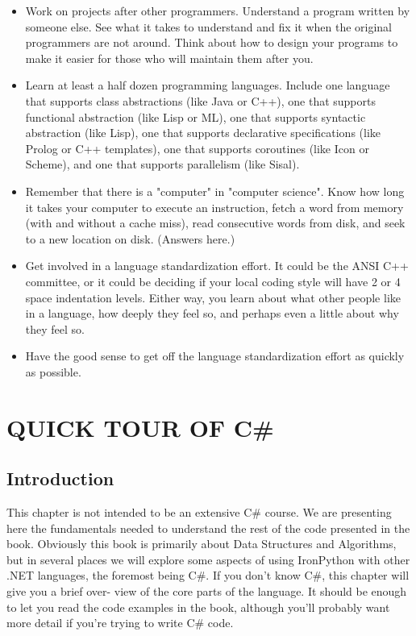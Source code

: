 \documentclass[12pt,a4paper,final,twoside,titlepage]{book}
\begin{document}
\begin{itemize}
\item Work on projects after other programmers. Understand a program written by someone else. See what it takes to understand and fix it when the original programmers are not around. Think about how to design your programs to make it easier for those who will maintain them after you.
\item Learn at least a half dozen programming languages. Include one language that supports class abstractions (like Java or C++), one that supports functional abstraction (like Lisp or ML), one that supports syntactic abstraction (like Lisp), one that supports declarative specifications (like Prolog or C++ templates), one that supports coroutines (like Icon or Scheme), and one that supports parallelism (like Sisal).
\item Remember that there is a "computer" in "computer science". Know how long it takes your computer to execute an instruction, fetch a word from memory (with and without a cache miss), read consecutive words from disk, and seek to a new location on disk. (Answers here.)
\item Get involved in a language standardization effort. It could be the ANSI C++ committee, or it could be deciding if your local coding style will have 2 or 4 space indentation levels. Either way, you learn about what other people like in a language, how deeply they feel so, and perhaps even a little about why they feel so.
\item Have the good sense to get off the language standardization effort as quickly as possible.
\end{itemize}

\chapter{QUICK TOUR OF C\#}
\section{Introduction}
This chapter is not intended to be an extensive C\# course. We are presenting here the fundamentals needed to understand the rest of the code presented in the book. Obviously this book is primarily about Data Structures and Algorithms, but in several places we will explore some aspects of using IronPython with other .NET languages, the foremost being C\#. If you don’t know C\#, this chapter will give you a brief over- view of the core parts of the language. It should be enough to let you read the code examples in the book, although you’ll probably want more detail if you’re trying to write C\# code.
\end{document}
